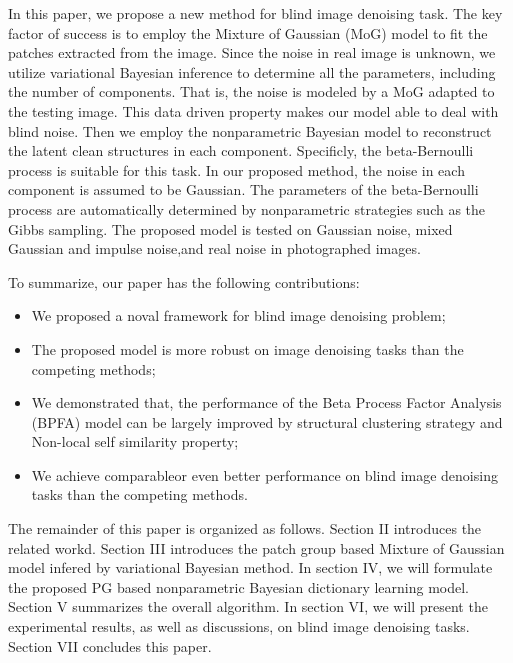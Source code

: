 \documentclass[runningheads]{llncs}
\begin{document}
In this paper, we propose a new method for blind image denoising task. The key factor of success is to employ the Mixture of Gaussian (MoG) model to fit the patches extracted from the image. Since the noise in real image is unknown, we utilize variational Bayesian inference to determine all the parameters, including the number of components. That is, the noise is modeled by a MoG adapted to the testing image. This data driven property makes our model able to deal with blind noise. Then we employ the nonparametric Bayesian model \cite{hjort1990} to reconstruct the latent clean structures in each component. Specificly, the beta-Bernoulli process \cite{thibaux2007,paisley2009} is suitable for this task. In our proposed method, the noise in each component is assumed to be Gaussian. The parameters of the beta-Bernoulli process are automatically determined by nonparametric strategies such as the Gibbs sampling. The proposed model is tested on Gaussian noise, mixed Gaussian and impulse noise,and real noise in photographed images.

To summarize, our paper has the following contributions:
\vspace{-0.1in}
\begin{itemize}
\item We proposed a noval framework for blind image denoising problem; 
\item The proposed model is more robust on image denoising tasks than the competing methods; 
\item We demonstrated that, the performance of the Beta Process Factor Analysis (BPFA) model can be largely improved by structural clustering strategy and Non-local self similarity property;
\item We achieve comparableor even better performance on blind image denoising tasks than the competing methods.
\end{itemize}

The remainder of this paper is organized as follows. Section II introduces the related workd. Section III introduces the patch group based Mixture of Gaussian model infered by variational Bayesian method. In section IV, we will formulate the proposed PG based nonparametric Bayesian dictionary learning model. Section V summarizes the overall algorithm. In section VI, we will present the experimental results, as well as discussions, on blind image denoising tasks. Section VII concludes this paper.

\end{document}
